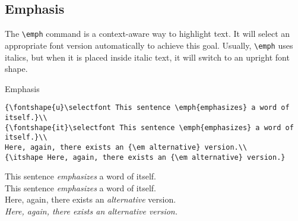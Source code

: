 \documentclass[a4paper,oneside,11pt]{article}
\newcommand\comm[1]{\texttt{\textbackslash#1}}
\begin{document}
\subsection{Emphasis}

The  \comm{emph}  command  is  a   context-aware  way  to  highlight  text. It
will  select  an  appropriate  font  version  automatically  to  achieve  this
goal. Usually, \comm{emph} uses  italics, but when it is  placed inside italic
text, it will switch to an upright font shape.

\begin{titled-frame}
{\textsf{Emphasis}}
\vspace{-1em}
\small
\begin{verbatim}
{\fontshape{u}\selectfont This sentence \emph{emphasizes} a word of itself.}\\
{\fontshape{it}\selectfont This sentence \emph{emphasizes} a word of itself.}\\
Here, again, there exists an {\em alternative} version.\\
{\itshape Here, again, there exists an {\em alternative} version.}
\end{verbatim}
\normalsize
{\selectfont This sentence \emph{emphasizes} a word of itself.}\\
{\selectfont This sentence \emph{emphasizes} a word of itself.}\\
Here, again, there exists an {\em alternative} version.\\
{\itshape Here, again, there exists an {\em alternative} version.}
\end{titled-frame}

%
\end{document}

